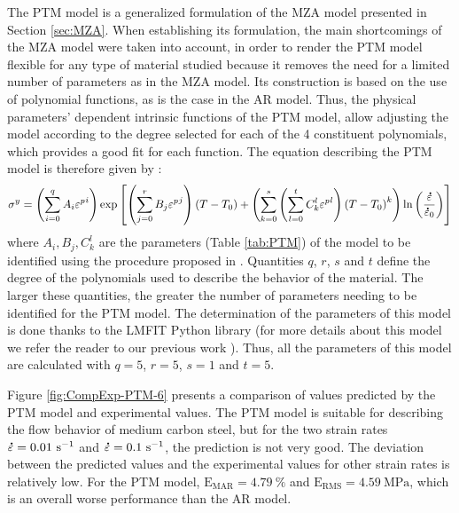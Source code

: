 \documentclass[metals,article,submit,pdftex,moreauthors]{Definitions/mdpi}
\DeclareRobustCommand{\mdot}[1]{\accentset{\mbox{\bfseries .}}{#1}}
\DeclareRobustCommand{\RMSE}{\text{E}_\text{RMS}}
\DeclareRobustCommand{\MARE}{\text{E}_\text{MAR}}
\DeclareRobustCommand{\ps}{\text{s}^{-1}}
\DeclareRobustCommand{\MPa}{\text{MPa}}
\begin{document}
The PTM model \cite{TizeMha-2022} is a generalized formulation of the MZA model presented in Section \ref{sec:MZA}.
When establishing its formulation, the main shortcomings of the MZA model were taken into account, in order to render the PTM model flexible for any type of material studied because it removes the need for a limited number of parameters as in the MZA model.
Its construction is based on the use of polynomial functions, as is the case in the AR model.
Thus, the physical parameters' dependent intrinsic functions of the PTM model, allow adjusting the model according to the degree selected for each of the 4 constituent polynomials, which provides a good fit for each function.
The equation describing the PTM model is therefore given by :
\begin{equation}
\label{eq:PTM-model}
\sigma^y = \left(\sum_{i=0}^{q}{A_i{\varepsilon^p}^{i}}\right) \exp\left[\left(\sum_{j=0}^{r}{B_j{\varepsilon^p}^{j}}\right)\left(T-T_0\right) + \left(\sum_{k=0}^{s}\left(\sum_{l=0}^{t}{C_k^l{\varepsilon^p}^{l}} \right)\left(T-T_0\right)^k \right)\ln\left( \frac{\mdot\varepsilon}{\mdot{\varepsilon}_0}\right)\right]
\end{equation}
where $A_i, B_j, C_k^l$ are the parameters (Table \ref{tab:PTM}) of the model to be identified using the procedure proposed in \cite{TizeMha-2022}.
Quantities $q$, $r$, $s$ and $t$ define the degree of the polynomials used to describe the behavior of the material.
The larger these quantities, the greater the number of parameters needing to be identified for the PTM model.
The determination of the parameters of this model is done thanks to the LMFIT Python library \cite{Newville-2016} (for more details about this model we refer the reader to our previous work \cite{TizeMha-2022}).
Thus, all the parameters of this model are calculated with $q=5$, $r=5$, $s=1$ and $t=5$.

Figure \ref{fig:CompExp-PTM-6} presents a comparison of values predicted by the PTM model and experimental values.
The PTM model is suitable for describing the flow behavior of medium carbon steel, but for the two strain rates $\mdot\varepsilon=0.01~\ps$ and $\mdot\varepsilon=0.1~\ps$, the prediction is not very good.
The deviation between the predicted values and the experimental values for other strain rates is relatively low.
For the PTM model, $\MARE=4.79~\%$ and $\RMSE=4.59~\MPa$, which is an overall worse performance than the AR model.
\end{document}
